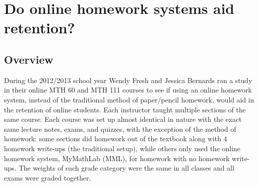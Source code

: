 \chapter{Do online homework systems aid retention?}
\label{app:sec:onlinehwstudy}

\section{Overview}
During the 2012/2013 school year Wendy Fresh and Jessica Bernards ran a study in their online MTH 60 and MTH 111 courses to see if using an online homework system, instead of the traditional method of paper/pencil homework, would aid in the retention of online students.  Each instructor taught multiple sections of the same course.  Each course was set up almost identical in nature with the exact same lecture notes, exams, and quizzes, with the exception of the method of homework: some sections did homework out of the textbook along with 4 homework write-ups (the traditional setup), while others only used the online homework system, MyMathLab (MML), for homework with no homework write-ups.  The weights of each grade category were the same in all classes and all exams were graded together.

